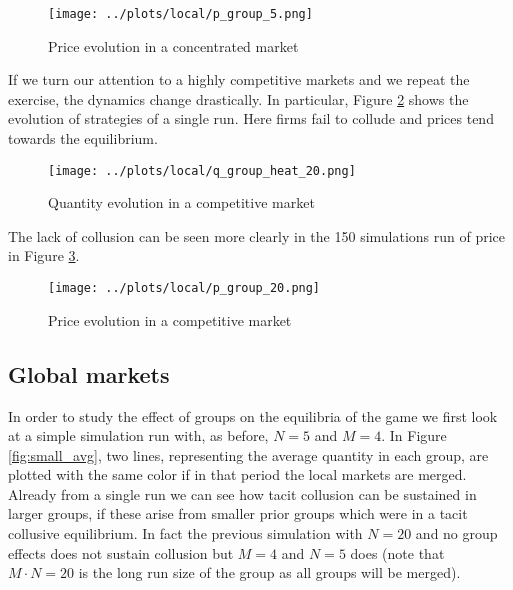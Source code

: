 \documentclass[american]{scrartcl}
\begin{document}
\begin{center}
    \begin{figure}[H]
        \center
        \texttt{[image: ../plots/local/p\_group\_5.png]}
        \caption{Price evolution in a concentrated market}
        \label{fig:price_small_local}
    \end{figure}
\end{center}

If we turn our attention to a highly competitive markets and we repeat the exercise, the dynamics change drastically. In particular, Figure \ref{fig:large_local} shows the evolution of strategies of a single run. Here firms fail to collude and prices tend towards the equilibrium.

\begin{center}
    \begin{figure}[H]
        \center
        \texttt{[image: ../plots/local/q\_group\_heat\_20.png]}
        \caption{Quantity evolution in a competitive market}
        \label{fig:large_local}
    \end{figure}
\end{center}

The lack of collusion can be seen more clearly in the 150 simulations run of price in Figure \ref{fig:price_large_local}.

\begin{center}
    \begin{figure}[H]
        \center
        \texttt{[image: ../plots/local/p\_group\_20.png]}
        \caption{Price evolution in a competitive market}
        \label{fig:price_large_local}
    \end{figure}
\end{center}

\subsection{Global markets}

In order to study the effect of groups on the equilibria of the game we first look at a simple simulation run with, as before, $N = 5$ and $M = 4$. In Figure \ref{fig:small_avg}, two lines, representing the average quantity in each group, are plotted with the same color if in that period the local markets are merged. Already from a single run we can see how tacit collusion can be sustained in larger groups, if these arise from smaller prior groups which were in a tacit collusive equilibrium. In fact the previous simulation with $N = 20$ and no group effects does not sustain collusion but $M = 4$ and $N = 5$ does (note that $M\cdot N = 20$ is the long run size of the group as all groups will be merged).
\end{document}
